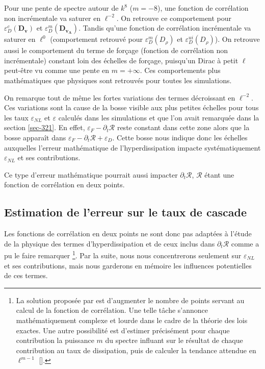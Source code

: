  Pour une pente de spectre autour de $k^8$ ($m=-8$), une fonction de corrélation non incrémentale va saturer en $\ell^{-2}$. On retrouve ce comportement pour $ \varepsilon^{c}_{D}(\boldsymbol{D_{v}}) $ et  $\varepsilon^{m}_{D}(\boldsymbol{D_{v_A}}) $. Tandis qu'une fonction de corrélation incrémentale va saturer en $\ell^0$ (comportement retrouvé pour  $ \varepsilon^{m}_{D}(D_{\rho}) $ et  $\varepsilon^{ui}_{D}(D_{\rho})$). On retrouve aussi le comportement du terme de forçage (fonction de corrélation non incrémentale) constant loin des échelles de forçage, puisqu'un Dirac à petit $\ell$ peut-être vu comme une pente en $m = +\infty$. Ces comportements plus mathématiques que physiques sont retrouvés pour toutes les simulations. 
 
 On remarque tout de même les fortes variations des termes décroissant en $\ell^{-2}$. Ces variations sont la cause de la bosse visible aux plus petites échelles pour tous les taux $\varepsilon_{NL}$ et $\varepsilon$ calculés dans les simulations et que l'on avait remarquée dans la section \ref{sec-321}. En effet, $\varepsilon_F - \partial_t \mathcal{R} $ reste constant dans cette zone alors que la bosse apparaît dans $\varepsilon_F - \partial_t \mathcal{R} + \varepsilon_D $. Cette bosse nous indique donc les échelles auxquelles l'erreur mathématique de l'hyperdissipation impacte systématiquement $\varepsilon_{NL}$ et ses contributions.  
 
  Ce type d'erreur mathématique pourrait aussi impacter $\partial_t \mathcal{R}$, $\mathcal{R}$ étant une fonction de corrélation en deux points.
  
  \subsection{Estimation de l'erreur sur le taux de cascade  } 
 
 Les fonctions de corrélation en deux points ne sont donc pas adaptées à l'étude de la physique des termes d'hyperdissipation et de ceux inclus dans $\partial_t \mathcal{R}$ comme a pu le faire remarquer \cite{cho_simulations_2009}\footnote{La solution proposée par \cite{cho_simulations_2009} est d'augmenter le nombre de points servant au calcul de la fonction de corrélation. Une telle tâche s'annonce mathématiquement complexe et lourde dans le cadre de la théorie des lois exactes. Une autre possibilité est d'estimer précisément pour chaque contribution la puissance $m$ du spectre influant sur le résultat de chaque contribution au taux de dissipation, puis de calculer la tendance attendue en $\ell^{m-1}$ [\cite{ferrand_multi-scale_2021}].}. Par la suite, nous nous concentrerons seulement sur $\varepsilon_{NL}$ et ses contributions, mais nous garderons en mémoire les influences potentielles de ces termes.
 
